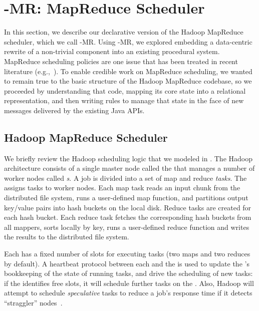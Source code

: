 \section{\BOOM-MR: MapReduce Scheduler}
\label{ch:boom:sec:port}

In this section, we describe our declarative version of the Hadoop MapReduce
scheduler, which we call \BOOM-MR.  Using \BOOM-MR, we explored embedding a
data-centric rewrite of a non-trivial component into an existing procedural
system.  MapReduce scheduling policies are one issue that has been treated in
recent literature (e.g.,~\cite{zaharia-late,delay-sched}).  To enable credible
work on MapReduce scheduling, we wanted to remain true to the basic structure
of the Hadoop MapReduce codebase, so we proceeded by understanding that code,
mapping its core state into a relational representation, and then writing
\OVERLOG rules to manage that state in the face of new messages delivered by
the existing Java APIs. 

\subsection{Hadoop MapReduce Scheduler}
\label{ch:boom:sec:hadoop}

We briefly review the Hadoop scheduling logic that we modeled in \OVERLOG.  The
Hadoop architecture consists of a single master node called the {\em \JT} that
manages a number of worker nodes called {\em {\TT}s}.  A job is divided into a
set of map and reduce {\em tasks}.  The {\JT} assigns tasks to worker nodes.
Each map task reads an input chunk from the distributed file system, runs a
user-defined map function, and partitions output key/value pairs into hash
buckets on the local disk.  Reduce tasks are created for each hash bucket.
Each reduce task fetches the corresponding hash buckets from all mappers, sorts
locally by key, runs a user-defined reduce function and writes the results to
the distributed file system.

Each {\TT} has a fixed number of slots for executing tasks (two maps and two
reduces by default).  A heartbeat protocol between each {\TT} and the {\JT} is
used to update the {\JT}'s bookkeeping of the state of running tasks, and drive
the scheduling of new tasks: if the {\JT} identifies free {\TT} slots, it will
schedule further tasks on the {\TT}.  Also, Hadoop will attempt to schedule
{\em speculative} tasks to reduce a job's response time if it detects
``straggler'' nodes~\cite{mapreduce-osdi}.

